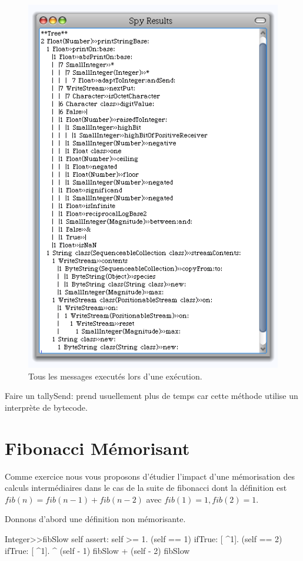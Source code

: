 \documentclass[a4paper,10pt,twoside]{book}
\begin{document}
\begin{figure}
	\begin{center}
	\includegraphics[width=.8\linewidth]{sendTally}
	\caption{Tous les messages execut\'es lors d'une ex\'ecution.}
	\end{center}
\end{figure}

Faire un tallySend: prend usuellement plus de temps car cette m\'ethode utilise un
interpr\`ete de bytecode. 



\section{Fibonacci M\'emorisant}
Comme exercice nous vous proposons d'\'etudier l'impact d'une
m\'emorisation des calculs interm\'ediaires dans le cas de la suite de
fibonacci dont la d\'efinition est $fib (n) = fib (n-1) + fib(n-2)$
avec $fib(1)=1, fib(2)=1$.

Donnons d'abord une d\'efinition non m\'emorisante.
\begin{code}{}
Integer>>fibSlow
	self assert: self >= 1.
	(self == 1) ifTrue: [ ^1].
	(self == 2) ifTrue: [ ^1].
	^ (self - 1) fibSlow + (self - 2) fibSlow
\end{code}
\end{document}
